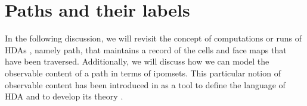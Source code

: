 \documentclass[11pt,a4paper,oldfontcommands]{memoir}
\begin{document}
\section{Paths and their labels}

In the following discussion, we will revisit the concept of computations or runs of HDAs \cite{VANGLABBEEK2006265}, namely path, that maintains a record of the cells and face maps that have been traversed. Additionally, we will discuss how we can model the observable content of a path in terms of ipomsets. This particular notion of observable content has been introduced in \cite{LanguageofHDA} as a tool to define the language of HDA and to develop its theory \cite{MyhillNerode,KleeneTh}. %
\end{document}
